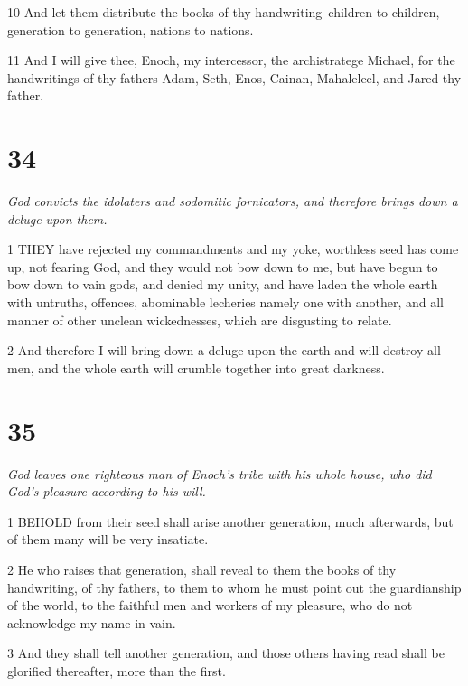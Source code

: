 \par 10 And let them distribute the books of thy handwriting--children to children, generation to generation, nations to nations.

\par 11 And I will give thee, Enoch, my intercessor, the archistratege Michael, for the handwritings of thy fathers Adam, Seth, Enos, Cainan, Mahaleleel, and Jared thy father.

\chapter{34}

\par \textit{God convicts the idolaters and sodomitic fornicators, and therefore brings down a deluge upon them.}

\par 1 THEY have rejected my commandments and my yoke, worthless seed has come up, not fearing God, and they would not bow down to me, but have begun to bow down to vain gods, and denied my unity, and have laden the whole earth with untruths, offences, abominable lecheries namely one with another, and all manner of other unclean wickednesses, which are disgusting to relate.

\par 2 And therefore I will bring down a deluge upon the earth and will destroy all men, and the whole earth will crumble together into great darkness.

\chapter{35}

\par \textit{God leaves one righteous man of Enoch's tribe with his whole house, who did God's pleasure according to his will.}

\par 1 BEHOLD from their seed shall arise another generation, much afterwards, but of them many will be very insatiate.

\par 2 He who raises that generation, shall reveal to them the books of thy handwriting, of thy fathers, to them to whom he must point out the guardianship of the world, to the faithful men and workers of my pleasure, who do not acknowledge my name in vain.

\par 3 And they shall tell another generation, and those others having read shall be glorified thereafter, more than the first.

